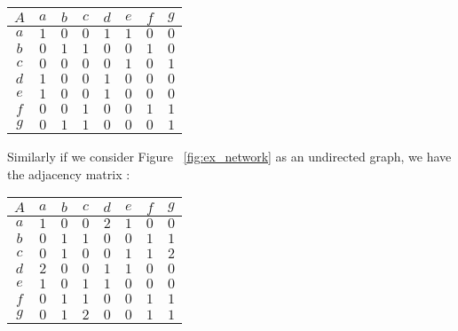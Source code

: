 \documentclass[a4paper, 12pt, twocolumn]{article}
\begin{document}

\begin{center}
       \begin{tabular}{c|ccccccc} 
              $ A $ & $ a $ & $ b $ & $ c $ & $ d $ & $ e $ & $ f $ & $ g $ \\
              \hline
              $ a $ & $ 1 $ & $ 0 $ & $ 0 $ & $ 1 $ & $ 1 $ & $ 0 $ & $ 0 $ \\
              $ b $ & $ 0 $ & $ 1 $ & $ 1 $ & $ 0 $ & $ 0 $ & $ 1 $ & $ 0 $ \\
              $ c $ & $ 0 $ & $ 0 $ & $ 0 $ & $ 0 $ & $ 1 $ & $ 0 $ & $ 1 $ \\
              $ d $ & $ 1 $ & $ 0 $ & $ 0 $ & $ 1 $ & $ 0 $ & $ 0 $ & $ 0 $ \\
              $ e $ & $ 1 $ & $ 0 $ & $ 0 $ & $ 1 $ & $ 0 $ & $ 0 $ & $ 0 $ \\
              $ f $ & $ 0 $ & $ 0 $ & $ 1 $ & $ 0 $ & $ 0 $ & $ 1 $ & $ 1 $ \\
              $ g $ & $ 0 $ & $ 1 $ & $ 1 $ & $ 0 $ & $ 0 $ & $ 0 $ & $ 1 $ \\
       \end{tabular}
\end{center}


\noindent
Similarly if we consider Figure ~\ref{fig:ex_network} as an undirected graph, we have the adjacency matrix :


\begin{center}
       \begin{tabular}{c|ccccccc} 
              $ A $ & $ a $ & $ b $ & $ c $ & $ d $ & $ e $ & $ f $ & $ g $ \\
              \hline
              $ a $ & $ 1 $ & $ 0 $ & $ 0 $ & $ 2 $ & $ 1 $ & $ 0 $ & $ 0 $ \\
              $ b $ & $ 0 $ & $ 1 $ & $ 1 $ & $ 0 $ & $ 0 $ & $ 1 $ & $ 1 $ \\
              $ c $ & $ 0 $ & $ 1 $ & $ 0 $ & $ 0 $ & $ 1 $ & $ 1 $ & $ 2 $ \\
              $ d $ & $ 2 $ & $ 0 $ & $ 0 $ & $ 1 $ & $ 1 $ & $ 0 $ & $ 0 $ \\
              $ e $ & $ 1 $ & $ 0 $ & $ 1 $ & $ 1 $ & $ 0 $ & $ 0 $ & $ 0 $ \\
              $ f $ & $ 0 $ & $ 1 $ & $ 1 $ & $ 0 $ & $ 0 $ & $ 1 $ & $ 1 $ \\
              $ g $ & $ 0 $ & $ 1 $ & $ 2 $ & $ 0 $ & $ 0 $ & $ 1 $ & $ 1 $ \\
       \end{tabular}
\end{center}
\end{document}
